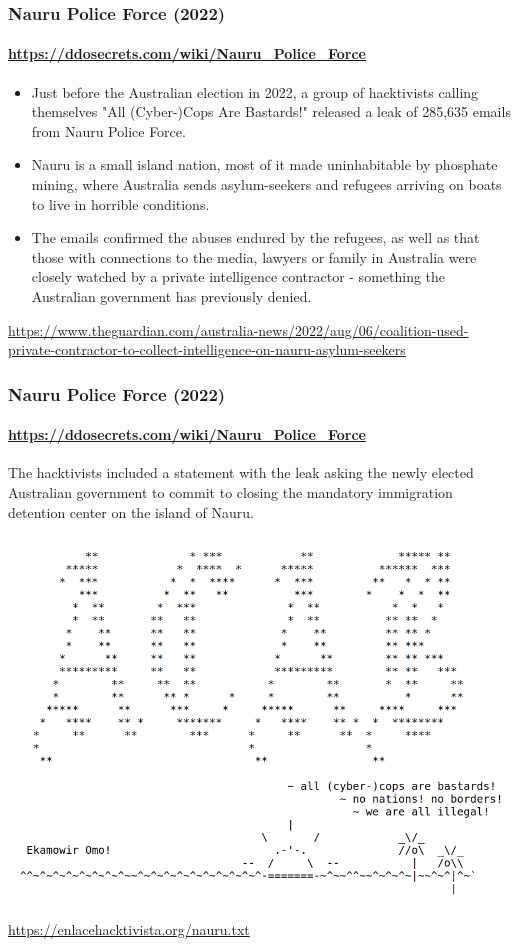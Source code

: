 \documentclass[aspectratio=169,usenames,dvipsnames]{beamer}
\begin{document}
\begin{frame}
  \frametitle{Nauru Police Force (2022)}
  \framesubtitle{\url{https://ddosecrets.com/wiki/Nauru_Police_Force}}

  \begin{itemize}[<+->]
    \item Just before the Australian election in 2022, a group of
      hacktivists calling themselves "All (Cyber-)Cops Are Bastards!" released
      a leak of 285,635 emails from Nauru Police Force.
    \item Nauru is a small island nation, most of it made uninhabitable by
      phosphate mining, where Australia sends asylum-seekers and refugees
      arriving on boats to live in horrible conditions.
    \item The emails confirmed the abuses endured by the refugees, as well as
      that those with connections to the media, lawyers or family in Australia
      were closely watched by a private intelligence contractor - something
      the Australian government has previously denied.
  \end{itemize}

  \vfill \centering \footnotesize \pause
  \url{https://www.theguardian.com/australia-news/2022/aug/06/coalition-used-private-contractor-to-collect-intelligence-on-nauru-asylum-seekers}

\end{frame}

\begin{frame}
  \frametitle{Nauru Police Force (2022)}
  \framesubtitle{\url{https://ddosecrets.com/wiki/Nauru_Police_Force}}

  The hacktivists included a statement with the leak asking the newly elected
  Australian government to commit to closing the mandatory immigration
  detention center on the island of Nauru.

  \centering \footnotesize

  \includegraphics[width=\textwidth,height=0.5\textheight,keepaspectratio]{img/nauru_txt.png}

  \vfill

  \url{https://enlacehacktivista.org/nauru.txt}

\end{frame}
\end{document}
